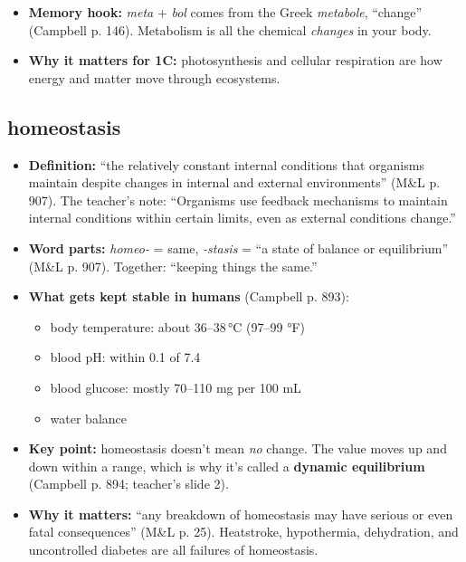 \documentclass[11pt,letterpaper]{article}
\begin{document}
\begin{itemize}
  \item \textbf{Memory hook:} \emph{meta} + \emph{bol} comes from the Greek \emph{metabole}, ``change'' (Campbell p. 146). Metabolism is all the chemical \emph{changes} in your body.
  \item \textbf{Why it matters for 1C:} photosynthesis and cellular respiration are how energy and matter move through ecosystems.
\end{itemize}


\subsection{homeostasis}
\begin{itemize}
  \item \textbf{Definition:} ``the relatively constant internal conditions that organisms maintain despite changes in internal and external environments'' (M\&L p. 907). The teacher's note: ``Organisms use feedback mechanisms to maintain internal conditions within certain limits, even as external conditions change.''
  \item \textbf{Word parts:} \emph{homeo-} = same, \emph{-stasis} = ``a state of balance or equilibrium'' (M\&L p. 907). Together: ``keeping things the same.''
  \item \textbf{What gets kept stable in humans} (Campbell p. 893):
  \begin{itemize}
    \item body temperature: about 36–38\,°C (97–99 °F)
    \item blood pH: within 0.1 of 7.4
    \item blood glucose: mostly 70–110 mg per 100 mL
    \item water balance
  \end{itemize}
  \item \textbf{Key point:} homeostasis doesn't mean \emph{no} change. The value moves up and down within a range, which is why it's called a \textbf{dynamic equilibrium} (Campbell p. 894; teacher's slide 2).
  \item \textbf{Why it matters:} ``any breakdown of homeostasis may have serious or even fatal consequences'' (M\&L p. 25). Heatstroke, hypothermia, dehydration, and uncontrolled diabetes are all failures of homeostasis.
\end{itemize}

\end{document}
